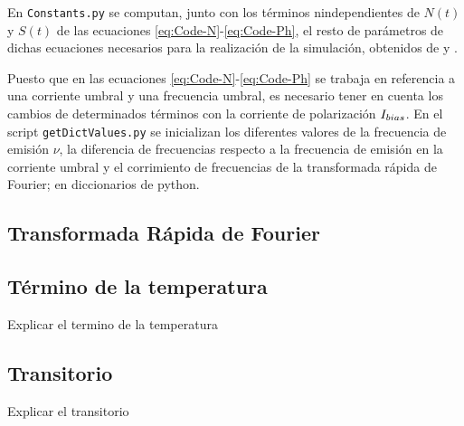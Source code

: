 	En \texttt{Constants.py} se computan, junto con los t\'erminos nindependientes de $N(t)$ y $S(t)$ de las ecuaciones \ref{eq:Code-N}-\ref{eq:Code-Ph}, el resto de par\'ametros de dichas ecuaciones necesarios para la realizaci\'on de la simulaci\'on, obtenidos de \cite{artSim} y \cite{Chaves19}.

	Puesto que en las ecuaciones \ref{eq:Code-N}-\ref{eq:Code-Ph} se trabaja en referencia a una corriente umbral y una frecuencia umbral, es necesario tener en cuenta los cambios de determinados t\'erminos con la corriente de polarización $I_{bias}$. En el script \texttt{getDictValues.py} se inicializan los diferentes valores de la frecuencia de emisión $\nu$, la diferencia de frecuencias respecto a la frecuencia de emisi\'on en la corriente umbral \cite{Chaves19} y el corrimiento de frecuencias de la transformada r\'apida de Fourier; en diccionarios de python.

	\subsection{Transformada R\'apida de Fourier}
		\label{Mdl:Code:Temp}

	\subsection{T\'ermino de la temperatura}
		\label{Mdl:Code:Temp}

		Explicar el termino de la temperatura

	\subsection{Transitorio}
		\label{Mdl:Code:Trans}

		Explicar el transitorio
